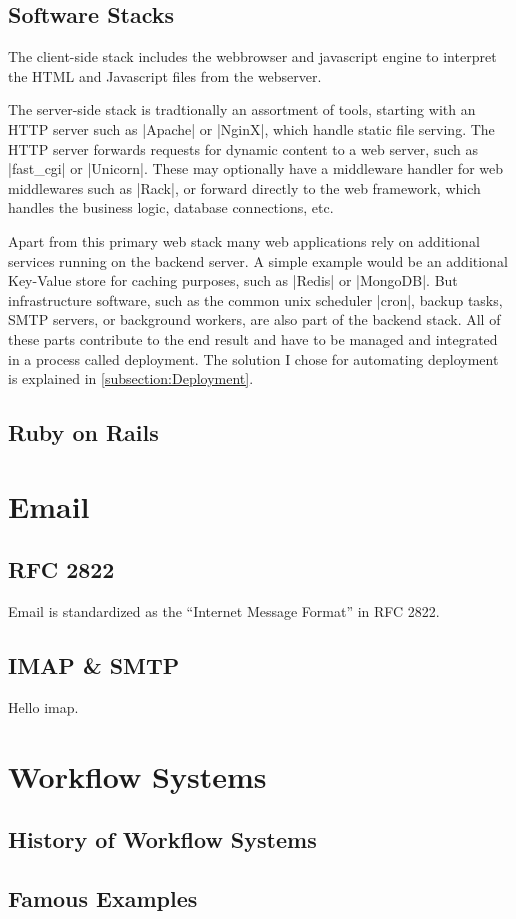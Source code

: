 \subsection{Software Stacks}

The client-side stack includes the webbrowser and javascript engine to interpret the HTML and Javascript files from the webserver.

The server-side stack is tradtionally an assortment of tools, starting with an HTTP server such as |Apache| or |NginX|, which handle static file serving. The HTTP server forwards requests for dynamic content to a web server, such as |fast_cgi| or |Unicorn|. These may optionally have a middleware handler for web middlewares such as |Rack|, or forward directly to the web framework, which handles the business logic, database connections, etc.

Apart from this primary web stack many web applications rely on additional services running on the backend server. A simple example would be an additional Key-Value store for caching purposes, such as |Redis| or |MongoDB|. But infrastructure software, such as the common unix scheduler |cron|, backup tasks, SMTP servers, or background workers, are also part of the backend stack. All of these parts contribute to the end result and have to be managed and integrated in a process called deployment. The solution I chose for automating deployment is explained in \autoref{subsection:Deployment}.

\subsection{Ruby on Rails}





\section{Email}


\subsection{RFC 2822}

Email is standardized as the ``Internet Message Format'' in RFC 2822\cite{email}.

\subsection{IMAP \& SMTP}

Hello \gls{imap}.


\section{Workflow Systems}


\subsection{History of Workflow Systems}


\subsection{Famous Examples}